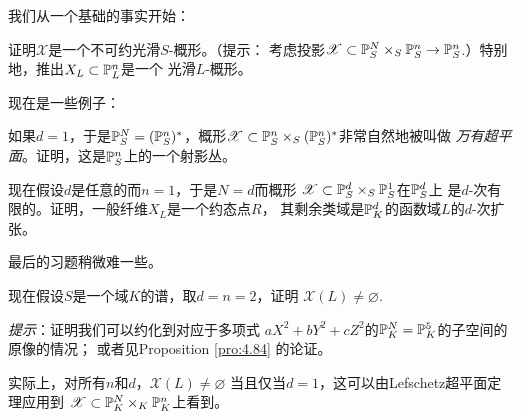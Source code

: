 我们从一个基础的事实开始：

\begin{exe}\label{exe:3.51}
证明$\mathscr X$是一个不可约光滑$S$-概形。（提示：
考虑投影$\mathscr X\subset \P_S^N\times_S \P_S^n
\to \P_S^n$.）特别地，推出$X_L\subset \P^n_L$是一个
光滑$L$-概形。
\end{exe}

现在是一些例子：

\begin{exe}\label{exe:3.52}
如果$d=1$，于是$\P_S^N=(\P^n_S)^*$，概形$\mathscr X
\subset \P_S^n\times_S (\P^n_S)^*$非常自然地被叫做
\textit{万有超平面}。证明，这是$\P_S^n$上的一个射影丛。
\end{exe}

\begin{exe}\label{exe:3.53}
现在假设$d$是任意的而$n=1$，于是$N=d$而概形
$\mathscr X\subset \P_S^d\times_S \P^1_S$在$\P_S^d$上
是$d$-次有限的。证明，一般纤维$X_L$是一个约态点$R$，
其剩余类域是$\P_K^d$的函数域$L$的$d$-次扩张。
\end{exe}

最后的习题稍微难一些。

\begin{exe}\label{exe:3.54}
现在假设$S$是一个域$K$的谱，取$d=n=2$，证明
$\mathscr X(L)\neq \varnothing$.

\textit{提示}：证明我们可以约化到对应于多项式
$aX^2+bY^2+cZ^2$的$\P^N_K=\P^5_K$的子空间的原像的情况；
或者见Proposition \ref{pro:4.84} 的论证。
\end{exe}

实际上，对所有$n$和$d$，$\mathscr X(L)\neq \varnothing$
当且仅当$d=1$，这可以由Lefschetz超平面定理应用到
$\mathscr X\subset \P_K^N\times_K \P_K^n$上看到。